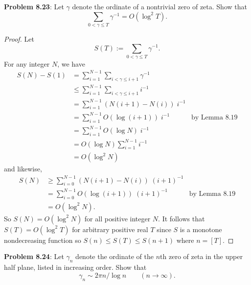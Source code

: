 \documentclass[12pt]{article}
\begin{document}
\fi

\textbf{Problem 8.23}: Let $\gamma$ denote the ordinate of a nontrivial zero of zeta. Show that
$$\sum_{0 < \gamma \leq T} \gamma^{-1} = O(\log^2 T).$$

\begin{proof}
Let
$$S(T) := \sum_{0 < \gamma \leq T} \gamma^{-1}.$$
For any integer $N$, we have
\begin{align*}
S(N) - S(1) &= \sum_{i = 1}^{N - 1} \sum_{i < \gamma \leq i + 1} \gamma^{-1}\\
&\leq \sum_{i = 1}^{N - 1} \sum_{i < \gamma \leq i + 1} i^{-1}\\
&= \sum_{i = 1}^{N - 1} (N(i+1) - N(i)) \; i^{-1}\\
&= \sum_{i = 1}^{N - 1} O(\log(i+1)) \; i^{-1} &\text{by Lemma 8.19}\\
&= \sum_{i = 1}^{N - 1} O(\log N) \; i^{-1}\\
&= O(\log N) \sum_{i = 1}^{N - 1} i^{-1} \\
&= O(\log^2 N)
\end{align*}
and likewise,
\begin{align*}
S(N) &\geq \sum_{i = 0}^{N - 1} (N(i+1) - N(i)) \; (i+1)^{-1}\\
&= \sum_{i = 0}^{N - 1} O(\log(i+1)) \; (i+1)^{-1} &\text{by Lemma 8.19}\\
&= O(\log^2 N).
\end{align*}
So $S(N) = O(\log^2 N)$ for all positive integer $N$. It follows that $S(T) = O(\log^2 T)$ for arbitrary positive real $T$ since $S$ is a monotone nondecreasing function so $S(n) \leq S(T) \leq S(n + 1)$ where $n = [T]$.
\end{proof}

\textbf{Problem 8.24}: Let $\gamma_n$ denote the ordinate of the $n$th zero of zeta in the upper half plane, listed in increasing order. Show that
$$\gamma_n \sim 2 \pi n / \log n \qquad (n \rightarrow \infty).$$
\end{document}
